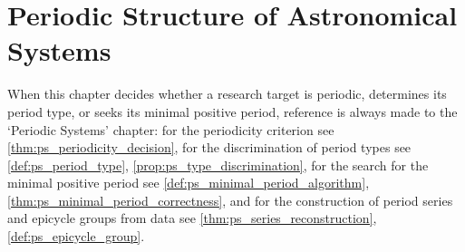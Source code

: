 \chapter{Periodic Structure of Astronomical Systems}
\label{chap:astro-periodic}

\begin{remark}\label{rem:astro_ps_hook}
When this chapter decides whether a research target is periodic, determines its period type, or seeks its minimal positive period, reference is always made to the `Periodic Systems' chapter:
for the periodicity criterion see \cref{thm:ps_periodicity_decision},
for the discrimination of period types see \cref{def:ps_period_type}, \cref{prop:ps_type_discrimination},
for the search for the minimal positive period see \cref{def:ps_minimal_period_algorithm}, \cref{thm:ps_minimal_period_correctness},
and for the construction of period series and epicycle groups from data see \cref{thm:ps_series_reconstruction}, \cref{def:ps_epicycle_group}.
\end{remark}

